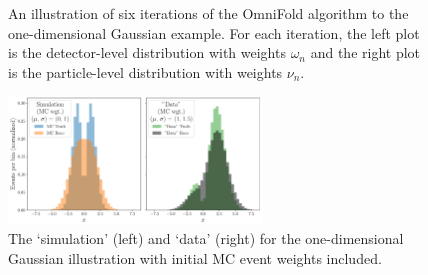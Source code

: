 \documentclass[NOTE, atlasdraft=true, texlive=2016, UKenglish]{\ATLASLATEXPATH atlasdoc}
\begin{document}
\begin{figure}[h!]
\caption{An illustration of six iterations of the OmniFold algorithm to the one-dimensional Gaussian example.  For each iteration, the left plot is the detector-level distribution with weights $\omega_n$ and the right plot is the particle-level distribution with weights $\nu_n$.}
\label{fig:gaussian:iterations}
\end{figure}

\begin{figure}[h!]
\centering
\includegraphics[width=0.6\textwidth]{Figures/GaussianToyExample/GaussianToyExample-MCDistributions.pdf}
\caption{The `simulation' (left) and `data' (right) for the one-dimensional Gaussian illustration with initial MC event weights included.}
\label{fig:gaussian:MCinputs}
\end{figure}
\end{document}

